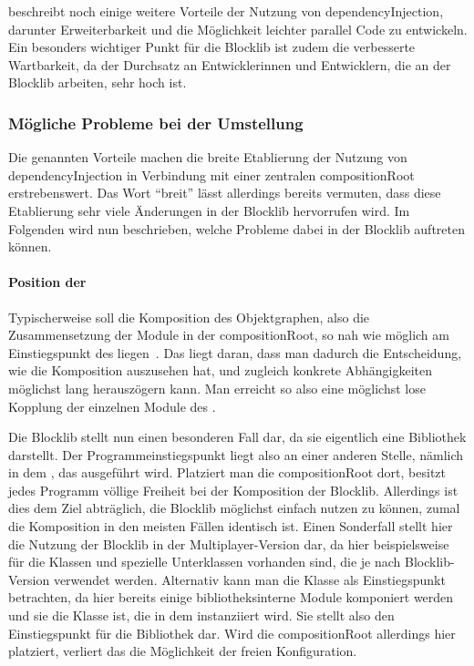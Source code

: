 \textcite[S.~15~ff.]{Seemann2012} beschreibt noch einige weitere Vorteile der Nutzung von \gls{dependencyInjection}, darunter Erweiterbarkeit und die Möglichkeit leichter parallel Code zu entwickeln. Ein besonders wichtiger Punkt für die Blocklib ist zudem die verbesserte Wartbarkeit, da der Durchsatz an Entwicklerinnen und Entwicklern, die an der Blocklib arbeiten, sehr hoch ist.

\subsubsection{Mögliche Probleme bei der Umstellung}
Die genannten Vorteile machen die breite Etablierung der Nutzung von \gls{dependencyInjection} in Verbindung mit einer zentralen \gls{compositionRoot} erstrebenswert. Das Wort \enquote{breit} lässt allerdings bereits vermuten, dass diese Etablierung sehr viele Änderungen in der Blocklib hervorrufen wird. Im Folgenden wird nun beschrieben, welche Probleme dabei in der Blocklib auftreten können.

\paragraph{Position der }
Typischerweise soll die Komposition des Objektgraphen, also die Zusammensetzung der Module in der \gls{compositionRoot}, so nah wie möglich am Einstiegspunkt des  liegen~\cites[S.~232~ff.]{Martin17}[S.~76~f.]{Seemann2012}. Das liegt daran, dass man dadurch die Entscheidung, wie die Komposition auszusehen hat, und zugleich konkrete Abhängigkeiten möglichst lang herauszögern kann. Man erreicht so also eine möglichst lose Kopplung der einzelnen Module des .

Die Blocklib stellt nun einen besonderen Fall dar, da sie eigentlich eine Bibliothek darstellt. Der Programmeinstiegspunkt liegt also an einer anderen Stelle, nämlich in dem \classBlockLibProgram{}, das ausgeführt wird. Platziert man die \gls{compositionRoot} dort, besitzt jedes \gls{Programm} völlige Freiheit bei der Komposition der Blocklib. Allerdings ist dies dem Ziel abträglich, die Blocklib möglichst einfach nutzen zu können, zumal die Komposition in den meisten Fällen identisch ist. Einen Sonderfall stellt hier die Nutzung der Blocklib in der Multiplayer-Version dar, da hier beispielsweise für die Klassen \classWorldInteraction{} und \classContext{} spezielle Unterklassen vorhanden sind, die je nach Blocklib-Version verwendet werden. Alternativ kann man die Klasse \classGame{} als Einstiegspunkt betrachten, da hier bereits einige bibliotheksinterne Module komponiert werden und sie die Klasse ist, die in dem \classBlockLibProgram{} instanziiert wird. Sie stellt also den Einstiegspunkt für die Bibliothek dar. Wird die \gls{compositionRoot} allerdings hier platziert, verliert das \classBlockLibProgram{} die Möglichkeit der freien Konfiguration.

